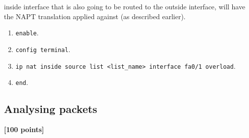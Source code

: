 \documentclass[pdftex,12pt,a4paper]{article}
\begin{document}
\begin{itemize}
                    inside interface that is also going to be routed to the
                    outside interface, will have the NAPT translation applied
                    against (as described earlier).
                    \begin{enumerate}
                        \item \texttt{enable}.
                        \item \texttt{config terminal}.
                        \item \texttt{ip nat inside source list <list\_name> interface
                            fa0/1 overload}.
                        \item \texttt{end}.
                    \end{enumerate}
            \end{itemize}

            \subsection{Analysing packets}
                \begin{flushright}
                    \textbf{[100 points]}
                \end{flushright}
\end{document}
